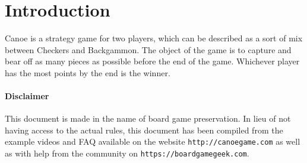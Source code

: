 \section{Introduction}
Canoe is a strategy game for two players, which can be described as a sort of mix between Checkers and Backgammon.
The object of the game is to capture and bear off as many pieces as possible before the end of the game.
Whichever player has the most points by the end is the winner.

\paragraph*{Disclaimer} This document is made in the name of board game preservation. In lieu of not having access to the actual rules, this document has been compiled from the example videos and FAQ available on the website \texttt{http://canoegame.com} as well as with help from the community on \texttt{https://boardgamegeek.com}.